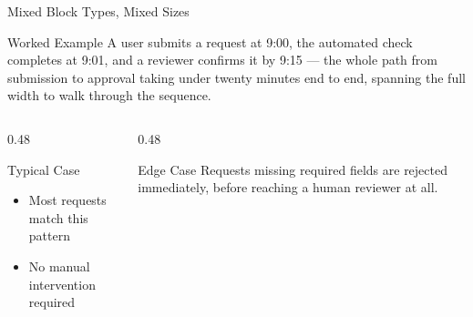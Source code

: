 \documentclass[aspectratio=169]{beamer}
\begin{document}
\begin{frame}{Mixed Block Types, Mixed Sizes}
  \begin{exampleblock}{Worked Example}
    {\small A user submits a request at 9:00, the automated check
    completes at 9:01, and a reviewer confirms it by 9:15 — the whole
    path from submission to approval taking under twenty minutes end
    to end, spanning the full width to walk through the sequence.}
  \end{exampleblock}
  \begin{columns}[T]
    \begin{column}{0.48\textwidth}
      \begin{block}{Typical Case}
        \begin{itemize}
          \item Most requests match this pattern
          \item No manual intervention required
        \end{itemize}
      \end{block}
    \end{column}
    \begin{column}{0.48\textwidth}
      \begin{alertblock}{Edge Case}
        {\small Requests missing required fields are rejected
        immediately, before reaching a human reviewer at all.}
      \end{alertblock}
    \end{column}
  \end{columns}
\end{frame}
\end{document}
